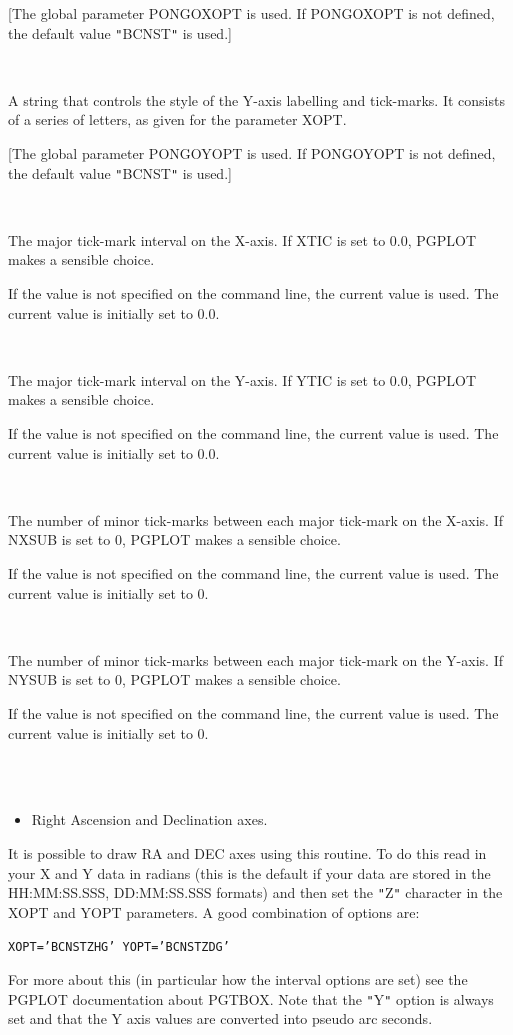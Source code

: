 \documentclass[twoside,11pt]{article}
\renewcommand{\_}{\texttt{\symbol{95}}}
\newcommand{\sstsubsection}[1]{ \item[{#1}] \mbox{} \\}
\newcommand{\sstnotes}[1]{\item[Notes:] \mbox{} \\[1.3ex] #1}
\newcommand{\sstitemlist}[1]{
  \mbox{} \\
  \vspace{-3.5ex}
  \begin{itemize}
     #1
  \end{itemize}
}
\newcommand{\sstitem}{\item}
\newcommand{\sstsubsection}[1]{\item[{#1}]}
\newcommand{\sstnotes}[1]{\item[Notes:] #1 }
\newcommand{\sstitemlist}[1]{
      \begin{itemize}
         #1
      \end{itemize}
      \\
   }
\newcommand{\sstitem}{\item}
\begin{document}
{{{         [The global parameter PONGO\_XOPT is used. If PONGO\_XOPT is not
         defined, the default value {\tt "}BCNST{\tt "} is used.]
      }
      \sstsubsection{
         YOPT = \_CHAR (Read and Write)
      }{
         A string that controls the style of the Y-axis labelling and
         tick-marks. It consists of a series of letters, as given for
         the parameter XOPT.

         [The global parameter PONGO\_YOPT is used.  If PONGO\_YOPT is not
         defined, the default value {\tt "}BCNST{\tt "} is used.]
      }
      \sstsubsection{
         XTIC = \_REAL (Read and Write)
      }{
         The major tick-mark interval on the X-axis. If XTIC is set to
         0.0, PGPLOT makes a sensible choice.

         If the value is not specified on the command line, the current
         value is used. The current value is initially set to 0.0.
      }
      \sstsubsection{
         YTIC = \_REAL (Read and Write)
      }{
         The major tick-mark interval on the Y-axis. If YTIC is set to
         0.0, PGPLOT makes a sensible choice.

         If the value is not specified on the command line, the current
         value is used. The current value is initially set to 0.0.
      }
      \sstsubsection{
         NXSUB = \_INTEGER (Read and Write)
      }{
         The number of minor tick-marks between each major tick-mark on
         the X-axis. If NXSUB is set to 0, PGPLOT makes a sensible
         choice.

         If the value is not specified on the command line, the current
         value is used. The current value is initially set to 0.
      }
      \sstsubsection{
         NYSUB = \_INTEGER (Read and Write)
      }{
         The number of minor tick-marks between each major tick-mark on
         the Y-axis. If NYSUB is set to 0, PGPLOT makes a sensible
         choice.

         If the value is not specified on the command line, the current
         value is used. The current value is initially set to 0.
      }
   }
   \sstnotes{
      \sstitemlist{

         \sstitem
         Right Ascension and Declination axes.

      }
         It is possible to draw RA and DEC axes using this routine. To
         do this read in your X and Y data in radians (this is the
         default if your data are stored in the HH:MM:SS.SSS,
         DD:MM:SS.SSS formats) and then set the {\tt "}Z{\tt "} character in the
         XOPT and YOPT parameters. A good combination of options are:
         \begin{description}
            \item \texttt{XOPT='BCNSTZHG' YOPT='BCNSTZDG'}
         \end{description}
         For more about this (in particular how the interval options are
         set) see the PGPLOT documentation about PGTBOX. Note that the
         {\tt "}Y{\tt "} option is always set and that the Y axis values are
         converted into pseudo arc seconds.
   }
}
\end{document}
